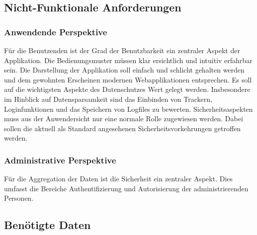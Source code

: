 

\subsection{Nicht-Funktionale Anforderungen}

    \subsubsection{Anwendende Perspektive}
        Für die Benutzenden ist der Grad der Benutzbarkeit ein zentraler Aspekt der Applikation. Die Bedienungsmuster müssen klar ersichtlich und intuitiv erfahrbar sein. Die Darstellung der Applikation soll einfach und schlicht gehalten werden und dem gewohnten Erscheinen modernen Webapplikationen entsprechen.
        Es soll auf die wichtigsten Aspekte des Datenschutzes Wert gelegt werden. Insbesondere im Hinblick auf Datensparsamkeit sind das Einbinden von Trackern, Loginfunktionen und das Speichern von Logfiles zu bewerten.
        Sicherheitsaspekten muss aus der Anwendersicht nur eine normale Rolle zugewiesen werden. Dabei sollen die aktuell als Standard angesehenen Sicherheitsvorkehrungen getroffen werden.

    \subsubsection{Administrative Perspektive}
        Für die Aggregation der Daten ist die Sicherheit ein zentraler Aspekt. Dies umfasst  die Bereiche Authentifizierung und Autorisierung der administrierenden Personen.



\subsection{Benötigte Daten}

